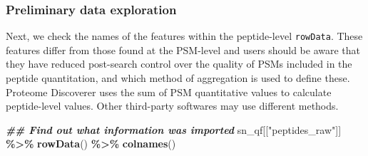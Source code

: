 \documentclass[9pt,a4paper,]{extarticle}
\newenvironment{Shaded}{\begin{snugshade}}{\end{snugshade}}
\newcommand{\DocumentationTok}[1]{\textcolor[rgb]{0.56,0.35,0.01}{\textbf{\textit{#1}}}}
\newcommand{\FunctionTok}[1]{\textcolor[rgb]{0.13,0.29,0.53}{\textbf{#1}}}
\newcommand{\NormalTok}[1]{#1}
\newcommand{\SpecialCharTok}[1]{\textcolor[rgb]{0.81,0.36,0.00}{\textbf{#1}}}
\newcommand{\StringTok}[1]{\textcolor[rgb]{0.31,0.60,0.02}{#1}}
\begin{document}
\hypertarget{preliminary-data-exploration-1}{%
\subsubsection{Preliminary data exploration}\label{preliminary-data-exploration-1}}

Next, we check the names of the features within the peptide-level \texttt{rowData}.
These features differ from those found at the PSM-level and users should be
aware that they have reduced post-search control over the quality of PSMs
included in the peptide quantitation, and which method of aggregation is used to
define these. Proteome Discoverer uses the sum of PSM quantitative values to
calculate peptide-level values. Other third-party softwares may use different
methods.

\begin{Shaded}
\begin{Highlighting}[]
\DocumentationTok{\#\# Find out what information was imported}
\NormalTok{sn\_qf[[}\StringTok{"peptides\_raw"}\NormalTok{]] }\SpecialCharTok{\%\textgreater{}\%}
  \FunctionTok{rowData}\NormalTok{() }\SpecialCharTok{\%\textgreater{}\%}
  \FunctionTok{colnames}\NormalTok{()}
\end{Highlighting}
\end{Shaded}
\end{document}
